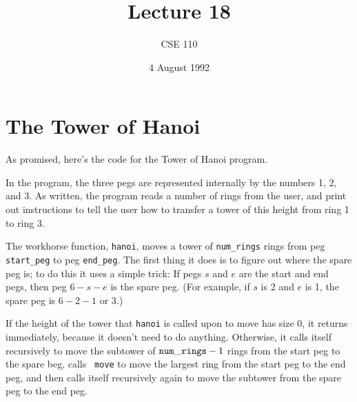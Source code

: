 

\def\brac#1{$<${#1}$>$}
\def\Int{{\tt int}}
\def\int{\brac{\Int}}
\def\int{\brac{\Int}}
\def\Shortint{{\tt short~int}}
\def\shortint{\brac{\Shortint}}
\def\Longint{{\tt long~int}}
\def\longint{\brac{\Longint}}
\def\Float{{\tt float}}
\def\float{\brac{\Float}}
\def\Double{{\tt double}}
\def\double{\brac{\Double}}
\def\Char{{\tt char}}
\def\chr{\brac{\Char}}
\def\Void{{\tt void}}
\def\void{\brac{\Void}}

\def\ptr#1{pointer~to {#1}}
\def\p2#1{\brac{\ptr{#1}}}
\def\Ano#1#2{array~of {#1}~{#2}s}
\def\ano#1#2{\brac{\Ano{#1}{#2}}}
\def\Ao#1{array~of {#1}}
\def\ao#1{\brac{\Ao#1}}

\def\np{{\tt NULL} pointer}

\def\breakhere{\mbox{$\otimes$}}


\title{Lecture 18}
\author{CSE 110}
\date{4 August 1992}

\parskip 8pt


\maketitle

\section{The Tower of Hanoi}

As promised, here's the code for the Tower of Hanoi program.

In the program, the three pegs are represented internally by the
numbers 1, 2, and 3.  As written, the program reads a number of rings
from the user, and print out instructions to tell the user how to
transfer a tower of this height from ring 1 to ring 3.  

The workhorse function, {\tt hanoi}, moves a tower of {\tt num\_rings}
rings from peg {\tt start\_peg} to peg {\tt end\_peg}.  The first thing
it does is to figure out where the spare peg is; to do this it uses a
simple trick: If pegs $s$ and $e$ are the start and end pegs, then peg
$6-s-e$ is the spare peg.  (For example, if $s$ is 2 and $e$ is 1, the
spare peg is $6-2-1$ or $3$.)

If the height of the tower that {\tt hanoi} is called upon to move has
size 0, it returns immediately, because it doesn't need to do anything.
Otherwise, it calls itself recursively to move the subtower of ${\tt
num\_rings} - 1$ rings from the start peg to the spare beg, calls {\tt
move} to move the largest ring from the start peg to the end peg, and
then calls itself recursively again to move the subtower from the spare
peg to the end peg.

